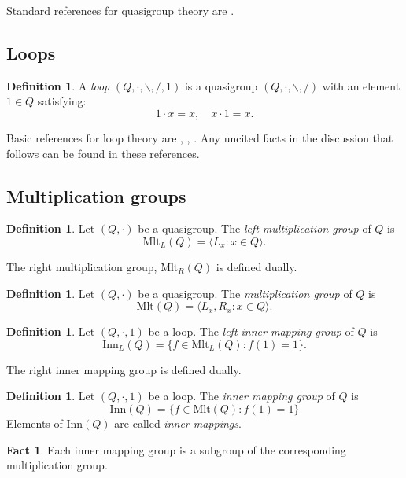 \documentclass[12pt]{report}
\theoremstyle{definition}
\newtheorem{fct}[thm]{Fact}
\newtheorem{dfn}[thm]{Definition}
\newcommand{\ldv}{\backslash}       %
\newcommand{\rdv}{/}                %
\newcommand{\mlt}{\text{Mlt}}       %
\newcommand{\inn}{\text{Inn}}       %
\begin{document}
Standard references for quasigroup theory are \cite{Belousov,Bruck,Pf,Shcherbacov,Smith}.

\subsection{Loops}

\begin{dfn}
  A \emph{loop} $(Q, \cdot, \ldv, \rdv, 1)$ is a quasigroup $(Q, \cdot, \ldv, \rdv)$ with an element $1\in Q$ satisfying:
  \[1\cdot x = x, \quad x\cdot 1 = x.\]
\end{dfn}

Basic references for loop theory are \cite{Bel}, \cite{Bruck}, \cite{Pf}. Any uncited facts in the discussion that follows
  can be found in these references.

\subsection{Multiplication groups}

\begin{dfn}
  Let $(Q, \cdot)$ be a quasigroup. The \emph{left multiplication group} of $Q$ is
  \[\mlt_L(Q) = \langle L_x : x\in Q\rangle.\]
\end{dfn}

The right multiplication group, $\mlt_R(Q)$ is defined dually.

\begin{dfn}
  Let $(Q, \cdot)$ be a quasigroup. The \emph{multiplication group} of $Q$ is
  \[\mlt(Q) = \langle L_x, R_x : x\in Q\rangle.\]
\end{dfn}

\begin{dfn}
  Let $(Q, \cdot, 1)$ be a loop. The \emph{left inner mapping group} of $Q$ is
  \[\inn_L(Q) = \{f\in \mlt_L(Q) : f(1) = 1\}.\]
\end{dfn}

The right inner mapping group is defined dually.

\begin{dfn}
  Let $(Q, \cdot, 1)$ be a loop. The \emph{inner mapping group} of $Q$ is
  \[\inn(Q) = \{f\in\mlt(Q) : f(1) = 1\}\]
  Elements of $\inn(Q)$ are called \emph{inner mappings}.
\end{dfn}

\begin{fct}
  Each inner mapping group is a subgroup of the corresponding multiplication group.
\end{fct}
\end{document}
